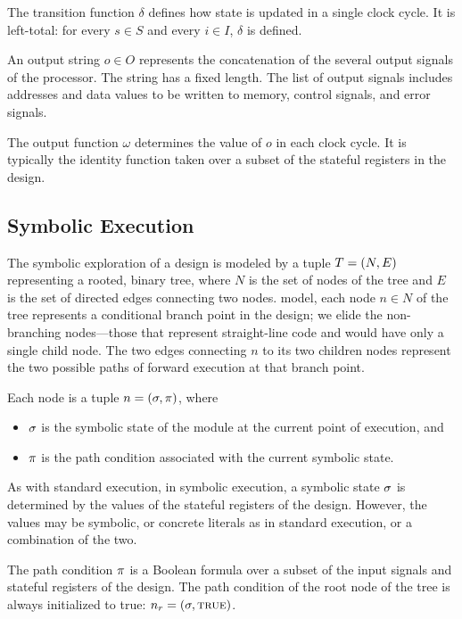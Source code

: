 The transition function $\delta$ defines how state is updated in a single clock
cycle. It is left-total: for every $s \in S$ and every $i \in I$, $\delta$ is defined.

An output string $o \in O$ represents the concatenation of the several output
signals of the processor. The string has a fixed length. The list of output
signals includes addresses and data values to be written to memory, control
signals, and error signals.

The output function $\omega$ determines the value of $o$ in each clock cycle. It
is typically the identity function taken over a subset of the stateful registers
in the design.

\subsection{Symbolic Execution}


The symbolic exploration of a design is modeled by a tuple $T = (N,E)$ representing a rooted, binary tree, where
$N$ is the set of nodes of the tree and $E$ is the set of directed edges connecting
two nodes.  model, each node $n \in N$ of the tree represents a conditional branch point in the
design; we elide the non-branching nodes---those that represent
straight-line code and would have only a single child node. The two edges connecting $n$ to its two children nodes represent the two
possible paths of forward execution at that branch point.

Each node is a tuple $n = (\sigma, \pi)$, where
\begin{itemize}
\item $\sigma$ is the symbolic state of the module at the current point of
  execution, and
\item $\pi$ is the path condition associated with the current
  symbolic state.
\end{itemize}


As with standard execution, in symbolic execution, a symbolic state $\sigma$
is determined by the values of the stateful registers of the design. However,
the values may be symbolic, or
concrete literals as in standard execution, or a combination of the two.

The path condition $\pi$ is a Boolean formula over a subset of the input signals and
stateful registers of the design. The path condition of the root node of the
tree is always initialized to true: $n_r = (\sigma, \mathtt{\textsc{true}})$.

